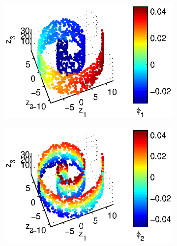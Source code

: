 \documentclass[3p]{elsarticle}
\begin{document}
\begin{figure}[!t]
\begin{subfigure}{0.25\textwidth}
\caption{}
\label{subfig:swissroll1_evals}
\end{subfigure}
%
\begin{subfigure}{0.25\textwidth}
\centering
\includegraphics[width=\textwidth]{swissroll1_color1}
\caption{}
\label{subfig:swissroll1_color1}
\end{subfigure}
%
\begin{subfigure}{0.25\textwidth}
\centering
\includegraphics[width=\textwidth]{swissroll1_color2}
\caption{}
\label{subfig:swissroll1_color2}
\end{subfigure}


\end{figure}
\end{document}
